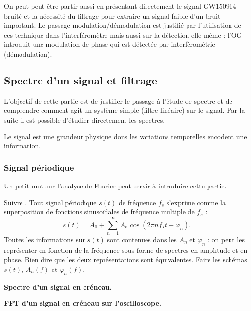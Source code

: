 On peut peut-être partir aussi en présentant directement le signal GW150914 bruité et la nécessité du filtrage pour extraire un signal faible d'un bruit important.
Le passage modulation/démodulation est justifié par l'utilisation de ces technique dans l'interféromètre mais aussi sur la détection elle même : l'OG introduit une  modulation de phase qui est détectée par interférométrie (démodulation).

\subsection{Spectre d'un signal et filtrage}

\begin{remarque}
L'objectif de cette partie est de justifier le passage à l'étude de spectre et de comprendre comment agit un système simple (filtre linéaire) sur le signal.
Par la suite il est possible d'étudier directement les spectres.
\end{remarque}

Le signal est une grandeur physique dons les variations temporelles encodent une information.

\subsubsection{Signal périodique}

Un petit mot sur l'analyse de Fourier peut servir à introduire cette partie.

Suivre \cite{Salamito2017}.
Tout signal périodique $s(t)$ de fréquence $f_s$ s'exprime comme la superposition de fonctions sinusoïdales de fréquence multiple de $f_s$ :
\begin{equation}
s(t) = A_0 + \sum_{n=1}^\infty A_n \cos(2\pi n f_s t + \varphi_n).
\end{equation}
Toutes les informations sur $s(t)$ sont contenues dans les $A_n$ et $\varphi_n$ : on peut les représenter en fonction de la fréquence sous forme de spectres en amplitude et en phase.
Bien dire que les deux représentations sont équivalentes.
Faire les schémas $s(t)$, $A_n(f)$ et $\varphi_n(f)$.

\begin{slide}
\textbf{Spectre d'un signal en créneau.}
\end{slide}

\begin{experience}
\textbf{FFT d'un signal en créneau sur l'oscilloscope.}
\end{experience}

